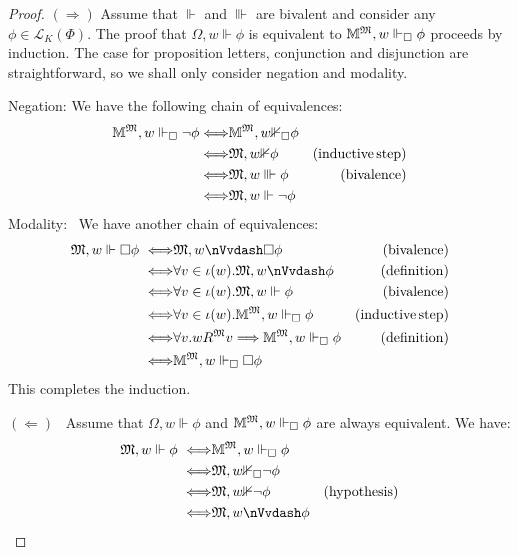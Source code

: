 \begin{proof}
  $(\Longrightarrow)$  Assume that $\Vdash$ and $\Vvdash$ are bivalent and
  consider any $\phi \in \mathcal{L}_K (\Phi)$.   The proof that $\Omega, w
  \Vdash \phi$ is equivalent to $\mathbbm{M}^{\Omega}, w \Vdash_{\Box} \phi$
  proceeds by induction.   The case for proposition letters, conjunction and
  disjunction are straightforward, so we shall only consider negation and
  modality.
  
  Negation:  We have the following chain of equivalences:
  \begin{eqnarray*}
    \mathbbm{M}^{\Omega}, w \Vdash_{\Box} \neg \phi  
    \Longleftrightarrow & \mathbbm{M}^{\Omega}, w {\nVdash}_{\Box} \phi &
    \\
    \Longleftrightarrow & \Omega, w {\nVdash} \phi & (\tmop{inductive}
    \tmop{step})\\
    \Longleftrightarrow & \Omega, w \Vvdash \phi & (\tmop{bivalence})\\
    \Longleftrightarrow & \Omega, w \Vdash \neg \phi & 
  \end{eqnarray*}
  Modality: \ We have another chain of equivalences:
  \begin{eqnarray*}
    \Omega, w \Vdash \Box \phi \  \Longleftrightarrow & \Omega, w
    {\nVvdash} \Box \phi & (\tmop{bivalence})\\
    \Longleftrightarrow & \forall v \in \iota (w) .  \Omega, w {\nVvdash}
    \phi & (\tmop{definition})\\
    \Longleftrightarrow & \forall v \in \iota (w) .  \Omega, w \Vdash \phi &
    (\tmop{bivalence})\\
    \Longleftrightarrow & \forall v \in \iota (w) .\mathbbm{M}^{\Omega}, w
    \Vdash_{\Box} \phi & (\tmop{inductive} \tmop{step})\\
    \Longleftrightarrow & \forall v.w R^{\Omega} v \Longrightarrow
    \mathbbm{M}^{\Omega}, w \Vdash_{\Box} \phi & (\tmop{definition})\\
    \Longleftrightarrow & \mathbbm{M}^{\Omega}, w \Vdash_{\Box} \Box \phi & 
  \end{eqnarray*}
  This completes the induction.
  
  $(\Longleftarrow)$ \ Assume that $\Omega, w \Vdash \phi$ and
  $\mathbbm{M}^{\Omega}, w \Vdash_{\Box} \phi$ are always equivalent.   We
  have:
  \begin{eqnarray*}
    \Omega, w \Vdash \phi \  \Longleftrightarrow &
    \mathbbm{M}^{\Omega}, w \Vdash_{\Box} \phi & \\
    \Longleftrightarrow & \Omega, w {\nVdash}_{\Box} \neg \phi & \\
    \Longleftrightarrow & \Omega, w {\nVdash} \neg \phi &
    (\tmop{hypothesis})\\
    \Longleftrightarrow & \Omega, w {\nVvdash} \phi & 
  \end{eqnarray*}
\end{proof}

